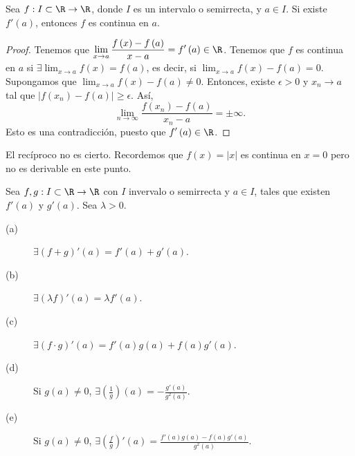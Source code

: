 \begin{ftheorem}[]
\normalfont Sea $\displaystyle f : I \subset \R \to \R $, donde $\displaystyle I $ es un intervalo o semirrecta, y $\displaystyle a \in I $. Si existe $\displaystyle f'\left(a\right) $, entonces $\displaystyle f $ es continua en $\displaystyle a $.
\end{ftheorem}
\begin{proof}
Tenemos que $\displaystyle \lim_{x \to a}\frac{f\left(x\right)-f\left(a\right)}{x-a} = f'\left(a\right) \in \R $. Tenemos que $\displaystyle f $ es continua en $\displaystyle a $ si $\displaystyle \exists\lim_{x \to a}f\left(x\right) = f\left(a\right) $, es decir, si $\displaystyle \lim_{x \to a}f\left(x\right)-f\left(a\right) = 0 $. Supongamos que $\displaystyle \lim_{x \to a}f\left(x\right)-f\left(a\right) \neq 0 $. 
Entonces, existe $\displaystyle \epsilon >0 $ y $\displaystyle x_{n} \to a $ tal que $\displaystyle \left|f\left(x_{n}\right)-f\left(a\right)\right| \geq \epsilon  $. Así,
\[\lim_{n \to \infty}\frac{f\left(x_{n}\right)-f\left(a\right)}{x_{n}-a} = \pm \infty .\]
Esto es una contradicción, puesto que $\displaystyle f'\left(a\right) \in \R $.
\end{proof}
\begin{eg}
\normalfont El recíproco no es cierto. Recordemos que $\displaystyle f\left(x\right) = \left|x\right| $ es continua en $\displaystyle x = 0 $ pero no es derivable en este punto.
\end{eg}
\begin{ftheorem}[]
\normalfont Sea $\displaystyle f,g : I \subset \R \to\R $ con $\displaystyle I $ invervalo o semirrecta y $\displaystyle a \in I $, tales que existen $\displaystyle f'\left(a\right) $ y $\displaystyle g'\left(a\right) $. Sea $\displaystyle \lambda > 0 $.
\begin{description}
\item[(a)] $\displaystyle \exists \left(f+g\right)'\left(a\right) = f'\left(a\right) +g'\left(a\right) $.
\item[(b)] $\displaystyle \exists \left(\lambda f\right)'\left(a\right) = \lambda f'\left(a\right) $.
\item[(c)] $\displaystyle \exists \left(f \cdot g\right)'\left(a\right) = f'\left(a\right)g\left(a\right) + f\left(a\right)g'\left(a\right)$.
\item[(d)] Si $\displaystyle g\left(a\right) \neq 0 $, $\displaystyle \exists \left(\frac{1}{g}\right)\left(a\right) = - \frac{g'\left(a\right)}{g^{2}\left(a\right)} $.
\item[(e)] Si $\displaystyle g\left(a\right) \neq 0 $, $\displaystyle \exists \left(\frac{f}{g}\right)'\left(a\right) = \frac{f'\left(a\right)g\left(a\right)-f\left(a\right)g'\left(a\right)}{g^{2}\left(a\right)}$.
\end{description}
\end{ftheorem}
